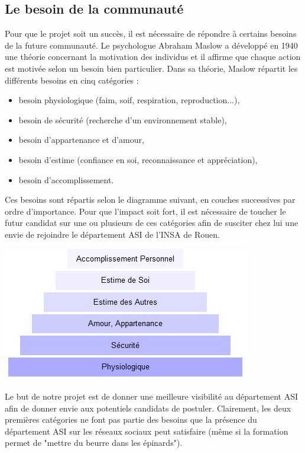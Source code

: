 \subsection{Le besoin de la communauté}

Pour que le projet soit un succès, il est nécessaire de répondre à certains besoins de la future communauté. Le psychologue Abraham Maslow a 
développé en 1940 une théorie concernant la motivation des individus et il affirme que chaque action est motivée selon un besoin bien particulier.
Dans sa théorie, Maslow répartit les différents besoins en cinq catégories :
\begin{itemize}
	\item besoin physiologique (faim, soif, respiration, reproduction...),
	\item besoin de sécurité (recherche d'un environnement stable),
	\item besoin d'appartenance et d'amour,
	\item besoin d'estime (confiance en soi, reconnaissance et appréciation),
	\item besoin d'accomplissement.
\end{itemize}

Ces besoins sont répartis selon le diagramme suivant, en couches successives par ordre d'importance. Pour que l'impact soit fort, il est nécessaire 
de toucher le futur candidat sur une ou plusieurs de ces catégories afin de susciter chez lui une envie de rejoindre le département ASI de l'INSA de Rouen.

\begin{center}
\includegraphics[scale=0.5]{./image/pyramidemaslow.jpg}
\end{center}

Le but de notre projet est de donner une meilleure visibilité au département ASI afin de donner envie aux potentiels candidats de postuler. Clairement, 
les deux premières catégories ne font pas partie des besoins que la présence du département ASI sur les réseaux sociaux peut satisfaire (même si la 
formation permet de "mettre du beurre dans les épinards").

